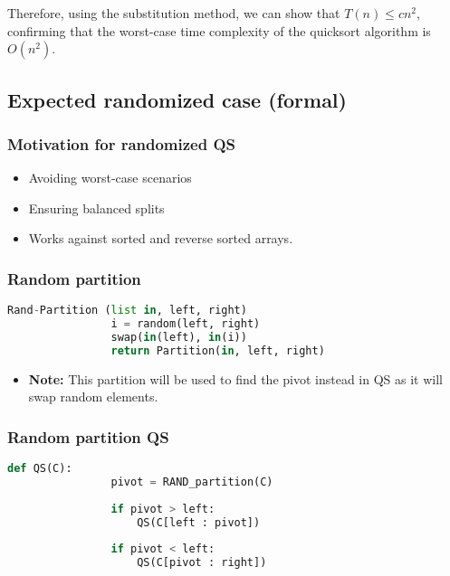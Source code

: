 \begin{derivation}
        \noindent Therefore, using the substitution method, we can show that \( T(n) \leq cn^2 \), confirming that the worst-case time complexity of the quicksort algorithm is \( O(n^2) \).
    \end{derivation}

\subsection{Expected randomized case (formal)}
    \subsubsection{Motivation for randomized QS}
    \begin{intuition}
        \begin{itemize}
            \item Avoiding worst-case scenarios
            \item Ensuring balanced splits
            \item Works against sorted and reverse sorted arrays.
        \end{itemize}
    \end{intuition}

    \subsubsection{Random partition}
    \begin{definition}
        \begin{lstlisting}[language=Python, caption={Rand-Partition Function Pseudocode}]
            Rand-Partition (list in, left, right)
                i = random(left, right)
                swap(in(left), in(i))
                return Partition(in, left, right)
        \end{lstlisting}
        \begin{itemize}
            \item \textbf{Note:} This partition will be used to find the pivot instead in QS as it will swap random elements.
        \end{itemize}
    \end{definition}

    \subsubsection{Random partition QS}
    \begin{definition}
        \begin{lstlisting}[language=Python, caption={QuickSort with Random Partition}]
            def QS(C):
                pivot = RAND_partition(C)
                
                if pivot > left:
                    QS(C[left : pivot])
                    
                if pivot < left:
                    QS(C[pivot : right])
            \end{lstlisting}            
    \end{definition}

